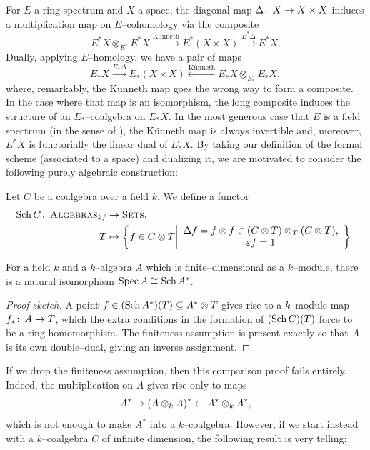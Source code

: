 For \(E\) a ring spectrum and \(X\) a space, the diagonal map \(\Delta\colon\thinspace X \to X \times X\) induces a multiplication map on \(E\)--cohomology via the composite \[E^* X \otimes_{E^*} E^* X \xrightarrow{\text{K\"unneth}} E^*(X \times X) \xrightarrow{E^* \Delta} E^* X.\]
Dually, applying \(E\)--homology, we have a pair of maps \[E_* X \xrightarrow{E_* \Delta} E_*(X \times X) \xleftarrow{\text{K\"unneth}} E_* X \otimes_{E_*} E_* X,\] where, remarkably, the K\"unneth map goes the wrong way to form a composite.
In the case where that map is an isomorphism, the long composite induces the structure of an \(E_*\)--coalgebra on \(E_* X\).
In the most generous case that \(E\) is a field spectrum (in the sense of ), the K\"unneth map is always invertible and, moreover, \(E^* X\) is functorially the linear dual of \(E_* X\).
By taking our definition of the formal scheme (associated to a space) and dualizing it, we are motivated to consider the following purely algebraic construction:

\begin{definition}
Let \(C\) be a coalgebra over a field \(k\).
We define a functor
\begin{align*}
\operatorname{Sch} C\colon\thinspace \normalfont\textsc{Algebras}_{k/} & \to \normalfont\textsc{Sets}, \\
T & \mapsto \left\{f \in C \otimes T \middle| \begin{array}{c} \Delta f = f \otimes f \in (C \otimes T) \otimes_T (C \otimes T), \\ \varepsilon f = 1 \end{array} \right\}.
\end{align*}
\end{definition}

\begin{lemma}
For a field \(k\) and a \(k\)--algebra \(A\) which is finite--dimensional as a \(k\)--module, there is a natural isomorphism \(\operatorname{Spec} A \cong \operatorname{Sch} A^*\).
\end{lemma}
\begin{proof}[Proof sketch]
A point \(f \in (\operatorname{Sch} A^*)(T) \subseteq A^* \otimes T\) gives rise to a \(k\)--module map \(f_*\colon\thinspace A \to T\), which the extra conditions in the formation of \((\operatorname{Sch} C)(T)\) force to be a ring homomorphism.
The finiteness assumption is present exactly so that \(A\) is its own double--dual, giving an inverse assignment.
\end{proof}

If we drop the finiteness assumption, then this comparison proof fails entirely.
Indeed, the multiplication on \(A\) gives rise only to maps \[A^* \to (A \otimes_k A)^* \leftarrow A^* \otimes_k A^*,\] which is not enough to make \(A^*\) into a \(k\)--coalgebra.
However, if we start instead with a \(k\)--coalgebra \(C\) of infinite dimension, the following result is very telling:

